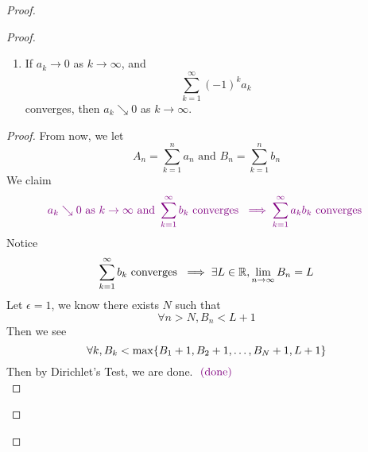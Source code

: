 \documentclass{report}
\begin{document}
\begin{proof}
\begin{proof}
\begin{question}{}{}
\begin{enumerate}
    \item If \( a_k \to 0 \) as \( k \to \infty \), and 
    \[
    \sum_{k=1}^{\infty} (-1)^k a_k
    \]
    converges, then \( a_k \searrow 0 \) as \( k \to \infty \).
\end{enumerate}
\end{question}
\begin{proof}
From now, we let 
\begin{equation}
A_n=\sum_{k=1}^n a_n\text{ and }B_n=\sum_{k=1}^n b_n
\end{equation}
We claim
\begin{equation}
  \textcolor{violet}{a_k\searrow 0\text{ as $k\to \infty$ and }\sum_{k=1}^\infty b_k\text{ converges }\implies \sum_{k=1}^\infty a_kb_k\text{ converges }}
\end{equation}
Notice 
\begin{equation}
\sum_{k=1}^\infty b_k\text{ converges }\implies \exists L\in\mathbb{R}, \lim_{n\to\infty}B_n=L
\end{equation}
Let $\epsilon =1$, we know there exists $N$ such that  
\begin{equation}
\forall n>N, B_n<L+1
\end{equation}
Then we see 
\begin{equation}
\forall k, B_k<\max \{ B_1+1,B_2+1,\dots ,B_{N}+1,L+1 \}
\end{equation}
Then by Dirichlet's Test, we are done. $\textcolor{violet}{\text{ (done) }}$\\


\end{proof}
\end{proof}
\end{proof}
\end{document}
